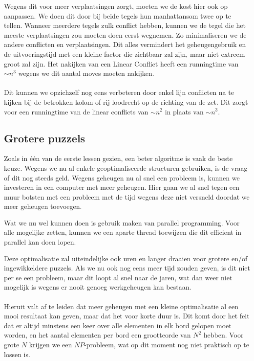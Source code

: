 \documentclass[a4paper]{article}
\numberwithin{equation}{section}
\begin{document}
        Wegens dit voor meer verplaatsingen zorgt, moeten we de kost hier ook op aanpassen. We doen dit door bij beide tegels hun manhattansom twee op te tellen. 
        Wanneer meerdere tegels zulk conflict hebben,
        kunnen we de tegel die het meeste verplaatsingen zou moeten doen eerst wegnemen. Zo minimaliseren we de andere conflicten en verplaatsingen. Dit alles vermindert het geheugengebruik en de uitvoeringstijd
        met een kleine factor die zichtbaar zal zijn, maar niet extreem groot zal zijn. Het nakijken van een Linear Conflict heeft een runningtime van $\sim n^3$ wegens we dit aantal moves moeten nakijken.
        \\
        \\Dit kunnen we opzichzelf nog eens verbeteren door enkel lijn conflicten na te kijken bij de betrokken kolom of rij loodrecht op de richting van de zet. Dit zorgt voor een runningtime van de linear conflicts van $\sim n^2$ in plaats van $\sim n^3$. 
    \pagebreak

    \subsection{Grotere puzzels}
    Zoals in \'e\'en van de eerste lessen gezien, een beter algoritme is vaak de beste keuze. Wegens we nu al enkele geoptimaliseerde structuren gebruiken, is de vraag of dit nog steeds geld.
    Wegens geheugen nu al snel een probleem is, kunnen we investeren in een computer met meer geheugen. Hier gaan we al snel tegen een muur botsten met een probleem met de tijd wegens deze niet versneld doordat we meer geheugen toevoegen.
    
    Wat we nu wel kunnen doen is gebruik maken van parallel programming. Voor alle mogelijke zetten, kunnen we een aparte thread toewijzen die dit efficient in parallel kan doen lopen.

    Deze optimalisatie zal uiteindelijke ook uren en langer draaien voor grotere en/of ingewikkeldere puzzels. Als we nu ook nog eens meer tijd zouden geven, is dit niet per se een probleem, maar dit loopt al snel naar de jaren, wat dan weer niet mogelijk is 
    wegens er nooit genoeg werkgeheugen kan bestaan.
    \\
    \\Hieruit valt af te leiden dat meer geheugen met een kleine optimalisatie al een mooi resultaat kan geven, maar dat het voor korte duur is. Dit komt door het feit dat
    er altijd minstens een keer over alle elementen in elk bord gelopen moet worden, en het aantal elementen per bord een grootteorde van $N^2$ hebben. Voor grote $N$ krijgen we een $NP$-probleem, wat op dit moment nog niet praktisch op te lossen is.

    
    
\end{document}
